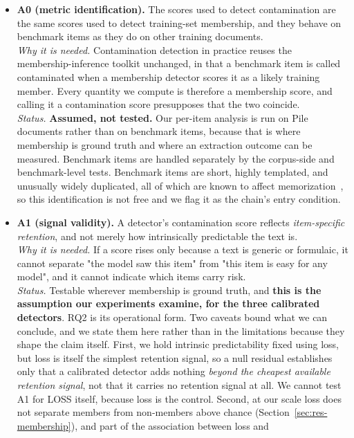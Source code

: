 \begin{itemize}
 \item \textbf{A0 (metric identification).} The scores used to detect contamination are
 the same scores used to detect training-set membership, and they behave on benchmark
 items as they do on other training documents. \\
 \emph{Why it is needed.} Contamination detection in practice reuses the
 membership-inference toolkit unchanged, in that a benchmark item is called contaminated
 when a membership detector scores it as a likely training member. Every quantity we
 compute is therefore a membership score, and calling it a contamination score
 presupposes that the two coincide. \\
 \emph{Status.} \textbf{Assumed, not tested.} Our per-item analysis is run on Pile
 documents rather than on benchmark items, because that is where membership is ground
 truth and where an extraction outcome can be measured. Benchmark items are handled
 separately by the corpus-side and benchmark-level tests. Benchmark items are short,
 highly templated, and unusually widely duplicated, all of which are known to affect
 memorization~\citep{carlini2023quantifying}, so this identification is not free and we
 flag it as the chain's entry condition.
 \item \textbf{A1 (signal validity).} A detector's contamination score reflects
 \emph{item-specific retention}, and not merely how intrinsically predictable the text
 is. \\
 \emph{Why it is needed.} If a score rises only because a text is generic or formulaic,
 it cannot separate "the model saw this item" from "this item is easy for any model", and
 it cannot indicate which items carry risk. \\
 \emph{Status.} Testable wherever membership is ground truth, and \textbf{this is the
 assumption our experiments examine, for the three calibrated detectors}. RQ2 is its
 operational form. Two caveats bound what we can conclude, and we state them here rather
 than in the limitations because they shape the claim itself. First, we hold intrinsic
 predictability fixed using loss, but loss is itself the simplest retention signal, so a
 null residual establishes only that a calibrated detector adds nothing \emph{beyond the
 cheapest available retention signal}, not that it carries no retention signal at all. We
 cannot test A1 for LOSS itself, because loss is the control. Second, at our scale loss
 does not separate members from non-members above chance
 (Section~\ref{sec:res-membership}), and part of the association between loss and

\end{itemize}
